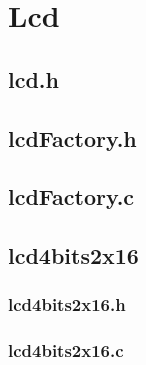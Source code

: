 \chapter{Lcd}

\section{lcd.h}


	
\section{lcdFactory.h}



\section{lcdFactory.c}




\section{lcd4bits2x16}

\subsection{lcd4bits2x16.h}



\subsection{lcd4bits2x16.c}


